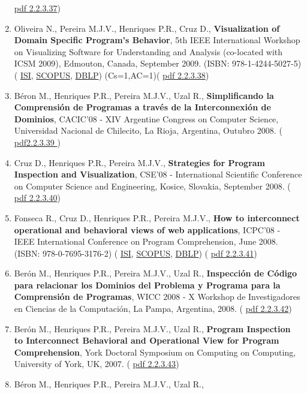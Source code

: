 \documentclass[11pt]{article}
\begin{document}
\begin{enumerate}
{\href{run:Publicacoes/publicacoes/42.pdf}{pdf 2.2.3.37})}
\item{Oliveira N., Pereira M.J.V., Henriques P.R., Cruz D., {
\bf{ Visualization of Domain Specific Program's Behavior}}, 5th IEEE International Workshop on Visualizing Software for Understanding and Analysis (co-located with ICSM 2009), Edmouton, Canada, September 2009. (ISBN: 978-1-4244-5027-5) (
\href{run:Publicacoes/ComprovativosISI.pdf}{ISI}, 
\href{run:Publicacoes/PublicacoesSCOPUS.pdf}{SCOPUS}, 
\href{run:Publicacoes/ComprovativosDBLP.pdf}{DBLP}) (Cs=1,AC=1)(
\href{run:Publicacoes/publicacoes/48.pdf}{pdf 2.2.3.38})}
\item{Béron M., Henriques P.R., Pereira M.J.V., Uzal R., {
\bf{ Simplificando la Comprensión de Programas a través de la Interconnexión de Dominios}}, CACIC'08 - XIV Argentine Congress on Computer Science, Universidad Nacional de Chilecito, La Rioja, Argentina, Outubro 2008. (
\href{run:Publicacoes/publicacoes/36.pdf}{pdf2.2.3.39 })}
\item{Cruz D., Henriques P.R., Pereira M.J.V., {
\bf{ Strategies for Program Inspection and Visualization}}, CSE'08 - International Scientific Conference on Computer Science and Engineering, Kosice, Slovakia, September 2008. (
\href{run:Publicacoes/publicacoes/31.pdf}{pdf 2.2.3.40})}
\item{Fonseca R., Cruz D., Henriques P.R., Pereira M.J.V., {
\bf{ How to interconnect operational and behavioral views of web applications}}, ICPC'08 - IEEE International Conference on Program Comprehension, June 2008. (ISBN: 978-0-7695-3176-2) (
\href{run:Publicacoes/ComprovativosISI.pdf}{ISI}, 
\href{run:Publicacoes/PublicacoesSCOPUS.pdf}{SCOPUS}, 
\href{run:Publicacoes/ComprovativosDBLP.pdf}{DBLP}) (
\href{run:Publicacoes/publicacoes/38.pdf}{pdf 2.2.3.41})}
\item{Berón M., Henriques P.R., Pereira M.J.V., Uzal R., {
\bf{ Inspección de Código para relacionar los Dominios del Problema y Programa para la Comprensión de Programas}}, WICC 2008 - X Workshop de Investigadores en Ciencias de la Computación, La Pampa, Argentina, 2008. (
\href{run:Publicacoes/publicacoes/32.pdf}{pdf 2.2.3.42})}
\item{Berón M., Henriques P.R., Pereira M.J.V., Uzal R., {
\bf{ Program Inspection to Interconnect Behavioral and Operational View for Program Comprehension}}, York Doctoral Symposium on Computing on Computing, University of York, UK, 2007. (
\href{run:Publicacoes/publicacoes/28.pdf}{pdf 2.2.3.43})}
\item{Béron M., Henriques P.R., Pereira M.J.V., Uzal R., {
}}
\end{enumerate}
\end{document}
